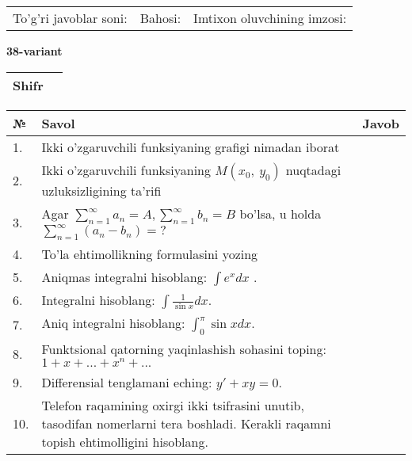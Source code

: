 \documentclass{article}
\begin{document}
  \vspace{1cm}
  
  \begin{tabular}{lll}
  To'g'ri javoblar soni: \underline{\hspace{1.5cm}} & 
  Bahosi: \underline{\hspace{1.5cm}} & 
  Imtixon oluvchining imzosi: \underline{\hspace{2cm}} \\
  \end{tabular}
  
  \egroup
  
  \newpage
  
  
  \textbf{38-variant}\\
  
  \bgroup
  \def\arraystretch{1.6} %
  
  \begin{tabular}{|m{5.7cm}|m{9.5cm}|}
  \hline
  Shifr & \\
  \hline
  \end{tabular}
  
  \vspace{1cm}
  
  \begin{tabular}{|m{0.7cm}|m{10cm}|m{4cm}|}
  \hline
  № & Savol & Javob \\
  \hline
  1. & Ikki o'zgaruvchili funksiyaning grafigi nimadan iborat &  \\
  \hline
  2. & Ikki o'zgaruvchili funksiyaning \(M(x_{0},\ y_{0})\) nuqtadagi uzluksizligining ta'rifi &  \\
  \hline
  3. & Agar \(\sum_{n = 1}^{\infty}a_{n} = A,\sum_{n = 1}^{\infty}b_{n} = B\) bo'lsa, u holda \(\sum_{n = 1}^{\infty}\left( a_{n} - b_{n} \right) = ?\) &  \\
  \hline
  4. & To'la ehtimollikning formulasini yozing &  \\
  \hline
  5. & Aniqmas integralni hisoblang: \(\int {e^{x}dx}\) . &  \\
  \hline
  6. & Integralni hisoblang: \(\int {\frac{1}{\sin x}dx}\). &  \\
  \hline
  7. & Aniq integralni hisoblang: \(\int_{0}^{\pi}{\sin xdx}\). &  \\
  \hline
  8. & Funktsional qatorning yaqinlashish sohasini toping:\(1 + x + ... + x^{n} + ...\) &  \\
  \hline
  9. & Differensial tenglamani eching: \(y' + xy = 0\). &  \\
  \hline
  10. & Telefon raqamining oxirgi ikki tsifrasini unutib, tasodifan nomerlarni tera boshladi. Kerakli raqamni topish ehtimolligini hisoblang. &  \\
  \hline
  \end{tabular}
  
\end{document}
